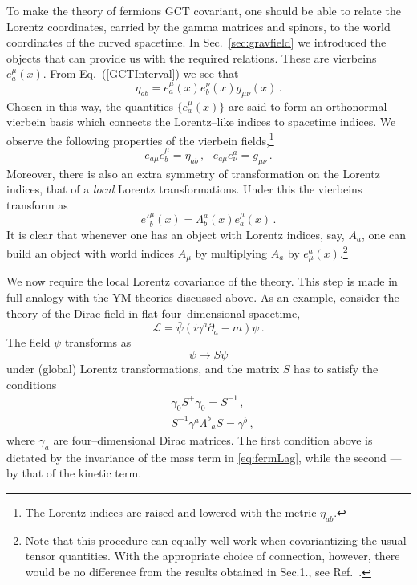 \documentclass[12pt]{article}
\newcommand{\be}{\begin{equation}}
\newcommand{\ee}{\end{equation}}
\newcommand\m{\mu}
\newcommand\g{\gamma}
\def\d{\partial}
\begin{document}
To make the theory of fermions GCT covariant, one should be able to relate the Lorentz coordinates, carried by the gamma matrices and spinors, to the world coordinates of the curved spacetime.
In Sec.~\ref{sec:gravfield} we introduced the objects that can provide us with the required relations.
These are vierbeins $e^\mu_a(x)$.
From Eq.~(\ref{GCTInterval}) we see that
\begin{equation}
\eta_{ab}=e^\mu_a(x)e^\nu_b(x)g_{\mu\nu}(x) \,.
\end{equation}
Chosen in this way, the quantities $\lbrace e^\mu_a(x)\rbrace $ are said to form an orthonormal vierbein basis which connects the Lorentz--like indices to spacetime indices. We observe the following properties of the vierbein fields,\footnote{The Lorentz indices are raised and lowered with the metric $\eta_{ab}$.}
\begin{equation}
e_{a \mu} e^{\mu}_b=\eta_{ab} \,,~~~ e_{a \mu} e^{a}_\nu=g_{\mu \nu} \,.
\end{equation}
Moreover, there is also an extra symmetry of transformation on the Lorentz indices, that of a {\em local} Lorentz transformations.
Under this the vierbeins transform as
\begin{equation}
e'^\mu_b(x)=\Lambda^a_{b}(x) e^\m_a(x)\,.
\end{equation}
It is clear that whenever one has an object with Lorentz indices, say, $A_a$, one can build an object with world indices $A_\mu$ by multiplying $A_a$ by $e^a_\mu(x)$.\footnote{Note that this procedure can equally well work when covariantizing the usual tensor quantities. With the appropriate choice of connection, however, there would be no difference from the results obtained in Sec.1., see Ref.~\cite{Ortin:2004ms}.}

We now require the local Lorentz covariance of the theory. This step is made in full analogy with the YM theories discussed above. As an example, consider the theory of the Dirac field in flat four--dimensional spacetime,
\be
\label{eq:fermLag}
 \mathcal{L}=\bar \psi (i\gamma^a \d_a -m)\psi \,.
\ee
The field $\psi$ transforms as
\be
\psi\to S\psi
\ee
under (global) Lorentz transformations, and the matrix $S$ has to satisfy the conditions
\be
\label{eq:invS}
\begin{split}
&\g_0S^+\g_0=S^{-1}\,,\\
&S^{-1}\g^a \Lambda^b_{\phantom{a}a} S=\g^b \,,
\end{split}
\ee
where $\g_a$ are four--dimensional Dirac matrices. The first condition above is dictated by the invariance of the mass term in \eqref{eq:fermLag}, while the second --- by that of the kinetic term.
\end{document}
